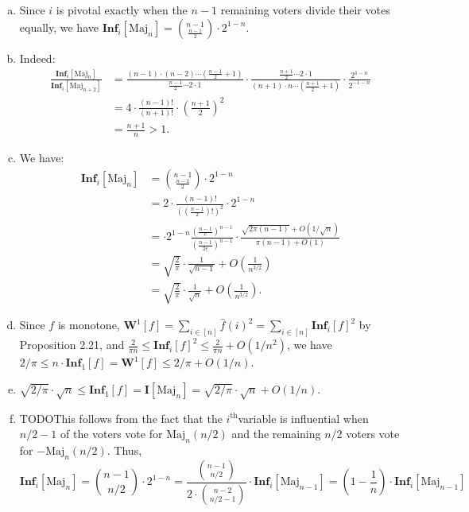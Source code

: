 \documentclass[12pt]{article}
\newcommand{\Inf}{\mathbf{Inf}}
\newcommand{\I}{\mathbf{I}}
\newcommand{\W}{\mathbf{W}}
\newcommand{\ith}{$i^\text{th}$}
\newcommand{\eqn}[1]{\begin{equation*}#1\end{equation*}}
\newcommand{\hf}{\widehat{f}}
\newcommand{\sumi}{\sum_{i \in [n]}}
\newcommand{\TODO}{{\color{red}TODO}}
\begin{document}
\subsection{}
\begin{enumerate}[(a)]
    \item Since $i$ is pivotal exactly when the $n - 1$ remaining voters divide their votes equally, we have $\Inf_i \left[\text{Maj}_n\right] = \binom{n-1}{\frac{n-1}{2}} \cdot 2^{1-n}$.
    
    \item Indeed:
    \begin{align*}
        \frac{\Inf_i \left[\text{Maj}_n\right]}{\Inf_i \left[\text{Maj}_{n+2}\right]} &= \frac{(n-1) \cdot (n - 2) \cdots \left(\frac{n-1}{2} + 1\right)}{\frac{n-1}{2} \cdots 2 \cdot 1} \cdot \frac{\frac{n+1}{2} \cdots 2 \cdot 1}{(n + 1) \cdot n \cdots \left(\frac{n+1}{2} + 1\right)} \cdot \frac{2^{1-n}}{2^{-1-n}}\\
        &= 4 \cdot \frac{(n-1)!}{(n+1)!} \cdot \left(\frac{n+1}{2}\right)^2\\
        &= \frac{n+1}{n} > 1.
    \end{align*}
    
    \item We have:
    \begin{align*}
        \Inf_i[\text{Maj}_n] &= \binom{n-1}{\frac{n-1}{2}} \cdot 2^{1-n}\\
        &= 2 \cdot \frac{(n-1)!}{\left(\left(\frac{n-1}{2}\right)!\right)^2} \cdot 2^{1-n}\\
        &= \cdot 2^{1-n} \frac{\left(\frac{n-1}{e}\right)^{n-1}}{\left(\frac{n-1}{2e}\right)^{n-1}} \cdot \frac{\sqrt{2 \pi (n-1)} + O(1/\sqrt{n})}{\pi (n-1) + O(1)}\\
        &= \sqrt{\frac{2}{\pi}} \cdot \frac1{\sqrt{n-1}} + O\left(\frac1{n^{3/2}}\right)\\
        &= \sqrt{\frac{2}{\pi}} \cdot \frac1{\sqrt{n}} + O\left(\frac1{n^{3/2}}\right).
    \end{align*}
    
    \item Since $f$ is monotone, $\W^1[f] = \sumi \hf(i)^2 = \sumi \Inf_i[f]^2$ by Proposition 2.21, and $\frac{2}{\pi n} \leq \Inf_i[f]^2 \leq \frac{2}{\pi n} + O(1/n^2)$, we have $2/\pi \leq n \cdot \Inf_1[f] = \W^1[f] \leq 2/\pi + O(1/n)$.
    
    \item $\sqrt{2/\pi} \cdot \sqrt{n} \leq \Inf_1[f] = \I[\text{Maj}_n] = \sqrt{2/\pi} \cdot \sqrt{n} + O(1/n)$.
    
    \item \TODO This follows from the fact that the \ith variable is influential when $n/2 - 1$ of the voters vote for $\text{Maj}_n(n/2)$ and the remaining $n/2$ voters vote for $-\text{Maj}_n(n/2)$. Thus,
    \eqn{\Inf_i[\text{Maj}_n] = \binom{n-1}{n/2} \cdot 2^{1-n} = \frac{\binom{n-1}{n/2}}{2 \cdot \binom{n-2}{n/2-1}} \cdot \Inf_i[\text{Maj}_{n-1}] = \left(1 - \frac1{n}\right) \cdot \Inf_i[\text{Maj}_{n-1}]}
\end{enumerate}
\end{document}
